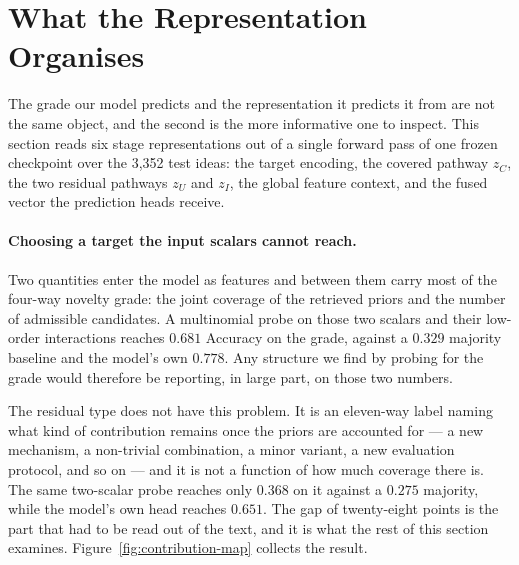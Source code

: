 \section{What the Representation Organises}
\label{sec:contribution-geometry}

The grade our model predicts and the representation it predicts it from are not the same
object, and the second is the more informative one to inspect. This section reads six
stage representations out of a single forward pass of one frozen checkpoint over the
3{,}352 test ideas: the target encoding, the covered pathway $z_C$, the two residual
pathways $z_U$ and $z_I$, the global feature context, and the fused vector the prediction
heads receive.

\paragraph{Choosing a target the input scalars cannot reach.}
Two quantities enter the model as features and between them carry most of the four-way
novelty grade: the joint coverage of the retrieved priors and the number of admissible
candidates. A multinomial probe on those two scalars and their low-order interactions
reaches $0.681$ Accuracy on the grade, against a $0.329$ majority baseline and the model's
own $0.778$. Any structure we find by probing for the grade would therefore be reporting,
in large part, on those two numbers.

The residual type does not have this problem. It is an eleven-way label naming what kind
of contribution remains once the priors are accounted for --- a new mechanism, a
non-trivial combination, a minor variant, a new evaluation protocol, and so on --- and it
is not a function of how much coverage there is. The same two-scalar probe reaches only
$0.368$ on it against a $0.275$ majority, while the model's own head reaches $0.651$. The
gap of twenty-eight points is the part that had to be read out of the text, and it is what
the rest of this section examines. Figure~\ref{fig:contribution-map} collects the result.

